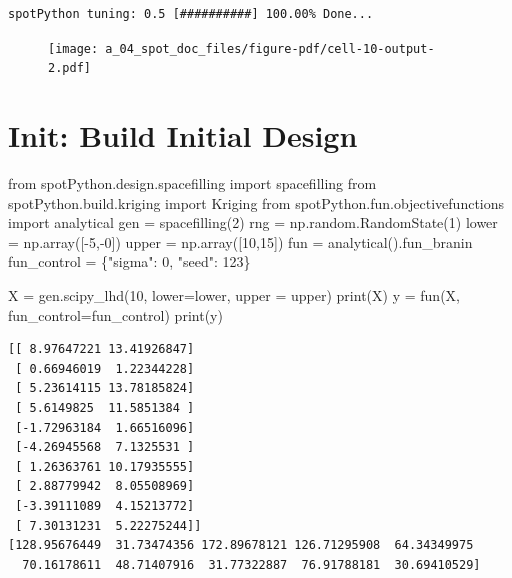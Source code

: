 \documentclass[
  letterpaper,
  DIV=11,
  numbers=noendperiod]{scrreprt}
\newenvironment{Shaded}{\begin{snugshade}}{\end{snugshade}}
\newcommand{\BuiltInTok}[1]{\textcolor[rgb]{0.00,0.23,0.31}{#1}}
\newcommand{\DecValTok}[1]{\textcolor[rgb]{0.68,0.00,0.00}{#1}}
\newcommand{\ImportTok}[1]{\textcolor[rgb]{0.00,0.46,0.62}{#1}}
\newcommand{\NormalTok}[1]{\textcolor[rgb]{0.00,0.23,0.31}{#1}}
\newcommand{\OperatorTok}[1]{\textcolor[rgb]{0.37,0.37,0.37}{#1}}
\newcommand{\StringTok}[1]{\textcolor[rgb]{0.13,0.47,0.30}{#1}}
\begin{document}
\begin{verbatim}
spotPython tuning: 0.5 [##########] 100.00% Done...
\end{verbatim}

\begin{figure}[H]

{\centering \texttt{[image: a\_04\_spot\_doc\_files/figure-pdf/cell-10-output-2.pdf]}

}

\end{figure}

\hypertarget{init-build-initial-design-1}{%
\section{Init: Build Initial Design}\label{init-build-initial-design-1}}

\begin{Shaded}
\begin{Highlighting}[]
\ImportTok{from}\NormalTok{ spotPython.design.spacefilling }\ImportTok{import}\NormalTok{ spacefilling}
\ImportTok{from}\NormalTok{ spotPython.build.kriging }\ImportTok{import}\NormalTok{ Kriging}
\ImportTok{from}\NormalTok{ spotPython.fun.objectivefunctions }\ImportTok{import}\NormalTok{ analytical}
\NormalTok{gen }\OperatorTok{=}\NormalTok{ spacefilling(}\DecValTok{2}\NormalTok{)}
\NormalTok{rng }\OperatorTok{=}\NormalTok{ np.random.RandomState(}\DecValTok{1}\NormalTok{)}
\NormalTok{lower }\OperatorTok{=}\NormalTok{ np.array([}\OperatorTok{{-}}\DecValTok{5}\NormalTok{,}\OperatorTok{{-}}\DecValTok{0}\NormalTok{])}
\NormalTok{upper }\OperatorTok{=}\NormalTok{ np.array([}\DecValTok{10}\NormalTok{,}\DecValTok{15}\NormalTok{])}
\NormalTok{fun }\OperatorTok{=}\NormalTok{ analytical().fun\_branin}
\NormalTok{fun\_control }\OperatorTok{=}\NormalTok{ \{}\StringTok{"sigma"}\NormalTok{: }\DecValTok{0}\NormalTok{,}
               \StringTok{"seed"}\NormalTok{: }\DecValTok{123}\NormalTok{\}}

\NormalTok{X }\OperatorTok{=}\NormalTok{ gen.scipy\_lhd(}\DecValTok{10}\NormalTok{, lower}\OperatorTok{=}\NormalTok{lower, upper }\OperatorTok{=}\NormalTok{ upper)}
\BuiltInTok{print}\NormalTok{(X)}
\NormalTok{y }\OperatorTok{=}\NormalTok{ fun(X, fun\_control}\OperatorTok{=}\NormalTok{fun\_control)}
\BuiltInTok{print}\NormalTok{(y)}
\end{Highlighting}
\end{Shaded}

\begin{verbatim}
[[ 8.97647221 13.41926847]
 [ 0.66946019  1.22344228]
 [ 5.23614115 13.78185824]
 [ 5.6149825  11.5851384 ]
 [-1.72963184  1.66516096]
 [-4.26945568  7.1325531 ]
 [ 1.26363761 10.17935555]
 [ 2.88779942  8.05508969]
 [-3.39111089  4.15213772]
 [ 7.30131231  5.22275244]]
[128.95676449  31.73474356 172.89678121 126.71295908  64.34349975
  70.16178611  48.71407916  31.77322887  76.91788181  30.69410529]
\end{verbatim}
\end{document}

